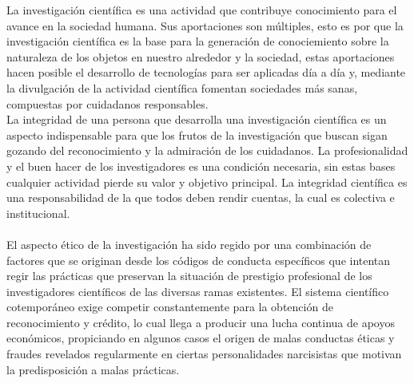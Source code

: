La investigación científica es una actividad que contribuye conocimiento para el avance en la sociedad humana. Sus aportaciones
son múltiples, esto es por que la investigación científica es la base para la generación de conociemiento sobre la naturaleza de los objetos en nuestro
alrededor y la sociedad, estas aportaciones hacen posible el desarrollo de tecnologías para ser aplicadas día a día y, mediante la divulgación
de la actividad científica fomentan sociedades más sanas, compuestas por cuidadanos responsables.\\
La integridad de una persona que desarrolla una investigación científica es un aspecto indispensable para que los frutos de 
la investigación que buscan sigan gozando del reconocimiento y la admiración de los cuidadanos. La profesionalidad y el buen hacer de los
investigadores es una condición necesaria, sin estas bases cualquier actividad pierde su valor y objetivo principal. La integridad científica
es una responsabilidad  de la que todos deben rendir cuentas, la cual es colectiva e institucional.\\\\
El aspecto ético de la investigación ha sido regido por una combinación de factores que se originan desde los códigos de conducta específicos 
que intentan regir las prácticas que preservan la situación de prestigio profesional de los investigadores científicos de las diversas ramas existentes.
El sistema científico cotemporáneo exige competir constantemente para la obtención de reconocimiento y crédito, lo cual llega a producir una lucha
continua de apoyos económicos, propiciando en algunos casos el origen de malas conductas éticas y fraudes revelados regularmente en ciertas personalidades
narcisistas que motivan la predisposición a malas prácticas. \cite{Cami2008}